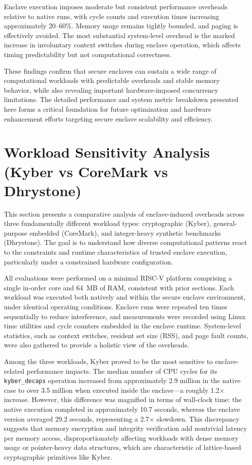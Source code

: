 Enclave execution imposes moderate but consistent performance overheads relative to native runs, with cycle counts and execution times increasing approximately 20--60\%. Memory usage remains tightly bounded, and paging is effectively avoided. The most substantial system-level overhead is the marked increase in involuntary context switches during enclave operation, which affects timing predictability but not computational correctness.

These findings confirm that secure enclaves can sustain a wide range of computational workloads with predictable overheads and stable memory behavior, while also revealing important hardware-imposed concurrency limitations. The detailed performance and system metric breakdown presented here forms a critical foundation for future optimization and hardware enhancement efforts targeting secure enclave scalability and efficiency.

\section{Workload Sensitivity Analysis (Kyber vs CoreMark vs Dhrystone)}
\label{sec:workload-sensitivity}

This section presents a comparative analysis of enclave-induced overheads across three fundamentally different workload types: cryptographic (Kyber), general-purpose embedded (CoreMark), and integer-heavy synthetic benchmarks (Dhrystone). The goal is to understand how diverse computational patterns react to the constraints and runtime characteristics of trusted enclave execution, particularly under a constrained hardware configuration.

All evaluations were performed on a minimal RISC-V platform comprising a single in-order core and 64~MB of RAM, consistent with prior sections. Each workload was executed both natively and within the secure enclave environment, under identical operating conditions. Enclave runs were repeated ten times sequentially to reduce interference, and measurements were recorded using Linux time utilities and cycle counters embedded in the enclave runtime. System-level statistics, such as context switches, resident set size (RSS), and page fault counts, were also gathered to provide a holistic view of the overheads.

Among the three workloads, Kyber proved to be the most sensitive to enclave-related performance impacts. The median number of CPU cycles for its \texttt{kyber\_decaps} operation increased from approximately 2.9 million in the native case to over 3.5 million when executed inside the enclave—a roughly 1.2$\times$ increase. However, this difference was magnified in terms of wall-clock time: the native execution completed in approximately 10.7 seconds, whereas the enclave version averaged 29.2 seconds, representing a 2.7$\times$ slowdown. This discrepancy suggests that memory encryption and integrity verification add nontrivial latency per memory access, disproportionately affecting workloads with dense memory usage or pointer-heavy data structures, which are characteristic of lattice-based cryptographic primitives like Kyber.

